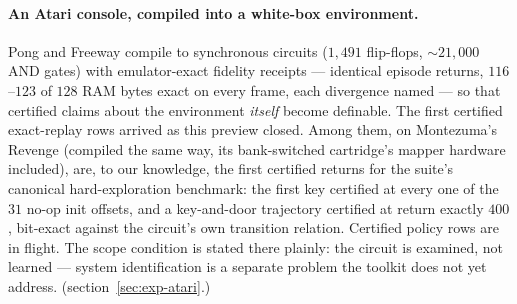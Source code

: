 \paragraph{An Atari console, compiled into a white-box environment.}
Pong and Freeway compile to synchronous circuits ($1{,}491$ flip-flops,
${\sim}21{,}000$ AND gates) with emulator-exact fidelity receipts ---
identical episode returns, $116$--$123$ of $128$ RAM bytes exact on
every frame, each divergence named --- so that certified claims about
the environment \emph{itself} become definable. The first certified
exact-replay rows arrived as this preview closed. Among them, on
Montezuma's Revenge (compiled the same way, its bank-switched
cartridge's mapper hardware included), are, to our knowledge, the
first certified returns for the suite's canonical hard-exploration
benchmark: the first key certified at every one of the $31$ no-op
init offsets, and a key-and-door trajectory certified at return
exactly $400$, bit-exact against the circuit's own transition
relation.
Certified policy rows are in flight. The scope condition is stated there
plainly: the circuit is examined, not learned --- system
identification is a separate problem the toolkit does not yet
address. (section~\ref{sec:exp-atari}.)

